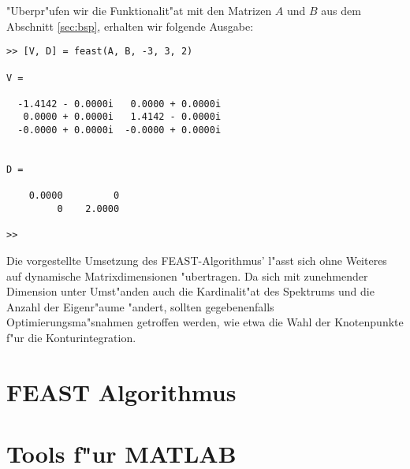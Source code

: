 "Uberpr"ufen wir die Funktionalit"at mit den Matrizen $A$ und $B$ aus dem Abschnitt
\ref{sec:bsp}, erhalten wir folgende Ausgabe:

\begin{lstlisting}[numbers=none]
>> [V, D] = feast(A, B, -3, 3, 2)

V =

  -1.4142 - 0.0000i   0.0000 + 0.0000i
   0.0000 + 0.0000i   1.4142 - 0.0000i
  -0.0000 + 0.0000i  -0.0000 + 0.0000i


D =

    0.0000         0
         0    2.0000

>>
\end{lstlisting}

\vspace{0.5cm}
Die vorgestellte Umsetzung des FEAST-Algorithmus' l"asst sich ohne Weiteres auf
dynamische Matrixdimensionen "ubertragen. Da sich mit zunehmender Dimension
unter Umst"anden auch die Kardinalit"at des Spektrums und die Anzahl der Eigenr"aume "andert, sollten
gegebenenfalls Optimierungsma"snahmen getroffen werden, wie etwa die Wahl der Knotenpunkte f"ur die
Konturintegration.

\section{FEAST Algorithmus}

\section{Tools f"ur MATLAB}
